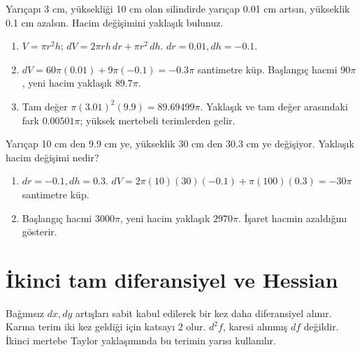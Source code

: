 \begin{tcolorbox}[title={Örnek 5.11 | Tahtadaki silindir hacmi değişimi},colframe=accent]Yarıçapı 3 cm, yüksekliği 10 cm olan silindirde yarıçap 0.01 cm artsın, yükseklik 0.1 cm azalsın. Hacim değişimini yaklaşık bulunuz.
\par{}\end{tcolorbox}
\begin{tcolorbox}[title={Adım adım çözüm},colback=green!3!white,colframe=green]\begin{enumerate}
\item \(V=\pi r^2h\); \(dV=2\pi rh\,dr+\pi r^2\,dh\). \(dr=0.01,dh=-0.1\).
\item \(dV=60\pi(0.01)+9\pi(-0.1)=-0.3\pi\) santimetre küp. Başlangıç hacmi \(90\pi\), yeni hacim yaklaşık \(89.7\pi\).
\item Tam değer \(\pi(3.01)^2(9.9)=89.69499\pi\). Yaklaşık ve tam değer arasındaki fark \(0.00501\pi\); yüksek mertebeli terimlerden gelir.
\end{enumerate}\end{tcolorbox}
\begin{tcolorbox}[title={Örnek 5.12 | Silindir için ikinci ders sorusu},colframe=accent]Yarıçap 10 cm den 9.9 cm ye, yükseklik 30 cm den 30.3 cm ye değişiyor. Yaklaşık hacim değişimi nedir?
\par{}\end{tcolorbox}
\begin{tcolorbox}[title={Adım adım çözüm},colback=green!3!white,colframe=green]\begin{enumerate}
\item \(dr=-0.1,dh=0.3\). \(dV=2\pi(10)(30)(-0.1)+\pi(100)(0.3)=-30\pi\) santimetre küp.
\item Başlangıç hacmi \(3000\pi\), yeni hacim yaklaşık \(2970\pi\). İşaret hacmin azaldığını gösterir.
\end{enumerate}\end{tcolorbox}
\section{İkinci tam diferansiyel ve Hessian}
Bağımsız \(dx,dy\) artışları sabit kabul edilerek bir kez daha diferansiyel alınır. Karma terim iki kez geldiği için katsayı 2 olur. \(d^2f\), karesi alınmış \(df\) değildir. İkinci mertebe Taylor yaklaşımında bu terimin yarısı kullanılır.


